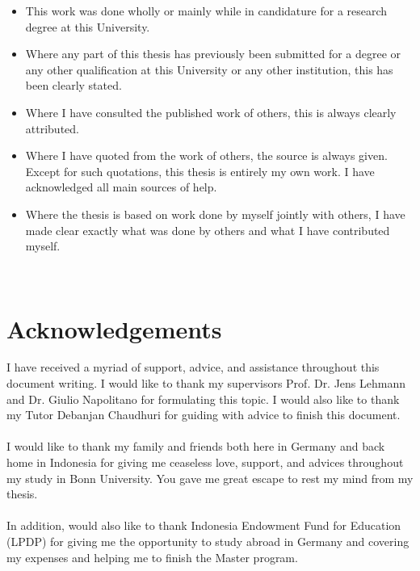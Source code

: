\documentclass[a4paper,12pt]{report}
\begin{document}
\begin{itemize}
	\item This work was done wholly or mainly while in candidature for
	a research degree at this University.
	\item Where any part of this thesis has previously been submitted for a degree
	or any other qualification at this University or any other institution,
	this has been clearly stated.
	\item Where I have consulted the published work of others, this is always
	clearly attributed.
	\item Where I have quoted from the work of others, the source is always
	given. Except for such quotations, this thesis is entirely my own work.
	I have acknowledged all main sources of help.
	\item Where the thesis is based on work done by myself jointly with others,
	I have made clear exactly what was done by others and what I have
	contributed myself.
\end{itemize}

\vskip5mm
\underline{}\\

\underline{}


\chapter*{Acknowledgements}
I have received a myriad of support, advice, and assistance throughout
this document writing. I would like to thank my supervisors Prof. Dr.
Jens Lehmann and Dr. Giulio Napolitano for formulating this topic. I
would also like to thank my Tutor Debanjan Chaudhuri for guiding with
advice to finish this document. \\~\\
I would like to thank my family and friends both here in Germany and
back home in Indonesia for giving me ceaseless love, support, and
advices throughout my study in Bonn University. You gave me great
escape to rest my mind from my thesis.
\\~\\
In addition, would also like to thank Indonesia Endowment Fund for
Education (LPDP) for giving me the opportunity to study abroad in
Germany and covering my expenses and helping me to finish the Master
program.
\end{document}
